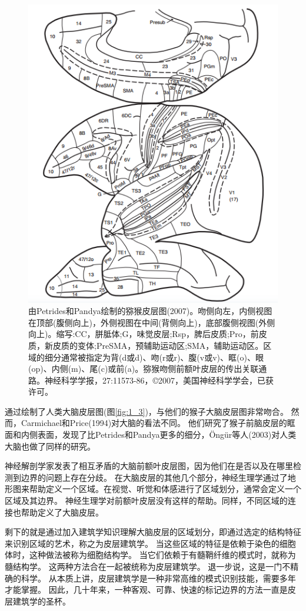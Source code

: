 \begin{figure}[!htb]
	\centering
	\includegraphics[width=0.5\linewidth]{image_pfc/Fig_1_2}
	\caption{由Petrides和Pandya绘制的猕猴皮层图(2007)。吻侧向左，内侧视图在顶部(腹侧向上)，外侧视图在中间(背侧向上)，底部腹侧视图(外侧向上)。缩写:CC，胼胝体;G，味觉皮层;Rsp，脾后皮质;Pro，前皮质，新皮质的变体;PreSMA，预辅助运动区;SMA，辅助运动区。区域的细分通常被指定为背(d或d)、吻(r或r)、腹(v或v)、眶(o)、眼(op)、内侧(m)、尾(c)或前(a)。猕猴吻侧前额叶皮层的传出关联通路。神经科学学报，27:11573-86，©2007，美国神经科学学会，已获许可。\label{fig:1_2}}
\end{figure}


\par
通过绘制了人类大脑皮层图(图\ref{fig:1_3})，与他们的猴子大脑皮层图非常吻合\cite{petrides1995impairments}。
然而，Carmichael和Price(1994)对大脑的看法不同\cite{carmichael1994architectonic}。
他们研究了猴子前脑皮层的眶面和内侧表面，发现了比Petrides和Pandya更多的细分，Öngür等人(2003)对人类大脑也做了同样的研究\cite{ongur2003architectonic}。

\par
神经解剖学家发表了相互矛盾的大脑前额叶皮层图，因为他们在是否以及在哪里检测到边界的问题上存在分歧。
在大脑皮层的其他几个部分，神经生理学通过了地形图来帮助定义一个区域。在视觉、听觉和体感进行了区域划分，通常会定义一个区域及其边界。
神经生理学对前额叶皮层没有这样的帮助。同样，不同区域的连接也帮助定义了大脑皮层。
\par
剩下的就是通过加入建筑学知识理解大脑皮层的区域划分，即通过选定的结构特征来识别区域的艺术，称之为皮层建筑学。
当这些区域的特征是依赖于染色的细胞体时，这种做法被称为细胞结构学。
当它们依赖于有髓鞘纤维的模式时，就称为髓结构学。
这两种方法合在一起被统称为皮层建筑学。
退一步说，这是一门不精确的科学。
从本质上讲，皮层建筑学是一种非常高维的模式识别技能，需要多年才能掌握。
因此，几十年来，一种客观、可靠、快速的标记边界的方法一直是皮层建筑学的圣杯。


